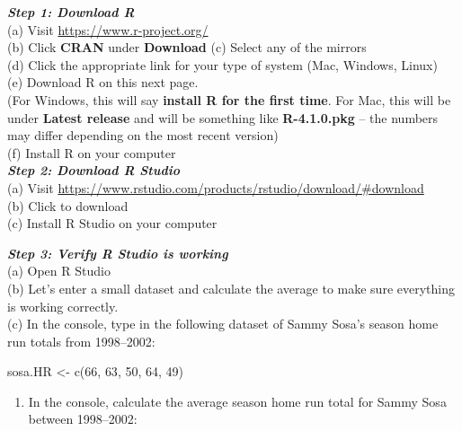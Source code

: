 \documentclass[
  11pt,
]{book}
\newenvironment{Shaded}{\begin{snugshade}}{\end{snugshade}}
\newcommand{\DecValTok}[1]{\textcolor[rgb]{0.00,0.00,0.81}{#1}}
\newcommand{\FunctionTok}[1]{\textcolor[rgb]{0.00,0.00,0.00}{#1}}
\newcommand{\NormalTok}[1]{#1}
\newcommand{\OtherTok}[1]{\textcolor[rgb]{0.56,0.35,0.01}{#1}}
\providecommand{\tightlist}{%
  \setlength{\itemsep}{0pt}\setlength{\parskip}{0pt}}
\theoremstyle{definition}
\theoremstyle{definition}
\theoremstyle{definition}
\theoremstyle{definition}
\theoremstyle{remark}
\begin{document}
\textbf{\emph{Step 1: Download R}}\\
(a) Visit \url{https://www.r-project.org/}\\
(b) Click \textbf{CRAN} under \textbf{Download}
(c) Select any of the mirrors\\
(d) Click the appropriate link for your type of system (Mac, Windows, Linux)\\
(e) Download R on this next page.\\
(For Windows, this will say \textbf{install R for the first time}. For Mac, this will be under \textbf{Latest release} and will be something like \textbf{R-4.1.0.pkg} -- the numbers may differ depending on the most recent version)\\
(f) Install R on your computer\\

\textbf{\emph{Step 2: Download R Studio}}\\
(a) Visit \url{https://www.rstudio.com/products/rstudio/download/\#download}\\
(b) Click to download\\
(c) Install R Studio on your computer\\

\newpage

\textbf{\emph{Step 3: Verify R Studio is working}}\\
(a) Open R Studio\\
(b) Let's enter a small dataset and calculate the average to make sure everything is working correctly.\\
(c) In the console, type in the following dataset of Sammy Sosa's season home run totals from 1998--2002:\\

\begin{Shaded}
\begin{Highlighting}[]
\NormalTok{sosa.HR }\OtherTok{\textless{}{-}} \FunctionTok{c}\NormalTok{(}\DecValTok{66}\NormalTok{, }\DecValTok{63}\NormalTok{, }\DecValTok{50}\NormalTok{, }\DecValTok{64}\NormalTok{, }\DecValTok{49}\NormalTok{)}
\end{Highlighting}
\end{Shaded}

\begin{enumerate}
\def\labelenumi{(\alph{enumi})}
\setcounter{enumi}{3}
\tightlist
\item
  In the console, calculate the average season home run total for Sammy Sosa between 1998--2002:\\
\end{enumerate}
\end{document}
